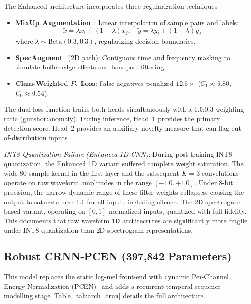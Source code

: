 \documentclass[conference]{IEEEtran}
\begin{document}
The Enhanced architecture incorporates three regularization techniques:
\begin{itemize}
    \item \textbf{MixUp Augmentation}~\cite{zhang2018}: Linear interpolation of sample pairs and labels:
    \begin{equation}
        \tilde{x} = \lambda x_i + (1\!-\!\lambda) x_j, \quad \tilde{y} = \lambda y_i + (1\!-\!\lambda) y_j
        \label{eq:mixup}
    \end{equation}
    where $\lambda \sim \text{Beta}(0.3, 0.3)$, regularizing decision boundaries.
    \item \textbf{SpecAugment}~\cite{park2019} (2D path): Contiguous time and frequency masking to simulate buffer edge effects and bandpass filtering.
    \item \textbf{Class-Weighted $F_2$ Loss}: False negatives penalized $12.5\times$ ($C_1 \approx 6.80$, $C_0 \approx 0.54$).
\end{itemize}

The dual loss function trains both heads simultaneously with a 1.0:0.3 weighting ratio (gunshot:anomaly). During inference, Head~1 provides the primary detection score. Head~2 provides an auxiliary novelty measure that can flag out-of-distribution inputs.

\textit{INT8 Quantization Failure (Enhanced 1D CNN)}: During post-training INT8 quantization, the Enhanced 1D variant suffered complete weight saturation. The wide 80-sample kernel in the first layer and the subsequent $K\!=\!3$ convolutions operate on raw waveform amplitudes in the range $[-1.0, +1.0]$. Under 8-bit precision, the narrow dynamic range of these filter weights collapses, causing the output to saturate near 1.0 for all inputs including silence. The 2D spectrogram-based variant, operating on $[0,1]$-normalized inputs, quantized with full fidelity. This documents that raw waveform 1D architectures are significantly more fragile under INT8 quantization than 2D spectrogram representations.

\subsection{Robust CRNN-PCEN (397{,}842 Parameters)}
This model replaces the static log-mel front-end with dynamic Per-Channel Energy Normalization (PCEN)~\cite{lostanlen2019} and adds a recurrent temporal sequence modelling stage. Table~\ref{tab:arch_crnn} details the full architecture.
\end{document}

